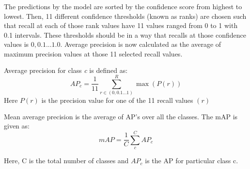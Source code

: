 \par

The predictions by the model are sorted by the confidence score from highest to lowest. Then, 11 different confidence thresholds (known as ranks) are chosen such that recall at each of those rank values have 11 values ranged from 0 to 1 with 0.1 intervals. These thresholds should be in a way that recalls at those confidence values is $0, 0.1...1.0$. Average precision is now calculated as the average of maximum precision values at those 11 selected recall values. 
\par
Average precision for class \textit{c} is defined as: 
\begin{equation}
    AP_{c} = \frac{1}{11} \sum_{r\in(0,0.1...1)}^R \max(P(r))
\end{equation}
Here $P(r)$ is the precision value for one of the 11 recall values $(r)$

\par

Mean average precision is the average of AP's over all the classes. The mAP is given as:
\begin{equation}
    mAP = \frac{1}{C} \sum_{c}^C AP_{c}
\end{equation}

Here, C is the total number of classes and $AP_{c}$ is the AP for particular class c. 
\afterpage{\null\newpage}